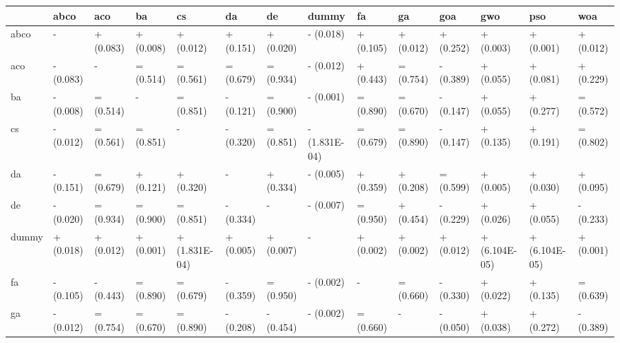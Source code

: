 \begin{table}
    \centering
    \begin{adjustbox}{width=\linewidth}
        \begin{tabular}{llllllllllllll}
            \toprule
            {}    & abco      & aco       & ba        & cs            & da        & de        & dummy         & fa        & ga        & goa       & gwo           & pso           & woa       \\
            \midrule
            abco  & -         & + (0.083) & + (0.008) & + (0.012)     & + (0.151) & + (0.020) & - (0.018)     & + (0.105) & + (0.012) & + (0.252) & + (0.003)     & + (0.001)     & + (0.012) \\
            aco   & - (0.083) & -         & = (0.514) & = (0.561)     & = (0.679) & = (0.934) & - (0.012)     & + (0.443) & = (0.754) & - (0.389) & + (0.055)     & + (0.081)     & + (0.229) \\
            ba    & - (0.008) & = (0.514) & -         & = (0.851)     & - (0.121) & = (0.900) & - (0.001)     & = (0.890) & = (0.670) & - (0.147) & + (0.055)     & + (0.277)     & = (0.572) \\
            cs    & - (0.012) & = (0.561) & = (0.851) & -             & - (0.320) & = (0.851) & - (1.831E-04) & = (0.679) & = (0.890) & - (0.147) & + (0.135)     & + (0.191)     & = (0.802) \\
            da    & - (0.151) & = (0.679) & + (0.121) & + (0.320)     & -         & + (0.334) & - (0.005)     & + (0.359) & + (0.208) & = (0.599) & + (0.005)     & + (0.030)     & + (0.095) \\
            de    & - (0.020) & = (0.934) & = (0.900) & = (0.851)     & - (0.334) & -         & - (0.007)     & = (0.950) & + (0.454) & - (0.229) & + (0.026)     & + (0.055)     & - (0.233) \\
            dummy & + (0.018) & + (0.012) & + (0.001) & + (1.831E-04) & + (0.005) & + (0.007) & -             & + (0.002) & + (0.002) & + (0.012) & + (6.104E-05) & + (6.104E-05) & + (0.001) \\
            fa    & - (0.105) & - (0.443) & = (0.890) & = (0.679)     & - (0.359) & = (0.950) & - (0.002)     & -         & = (0.660) & - (0.330) & + (0.022)     & + (0.135)     & = (0.639) \\
            ga    & - (0.012) & = (0.754) & = (0.670) & = (0.890)     & - (0.208) & - (0.454) & - (0.002)     & = (0.660) & -         & - (0.050) & + (0.038)     & + (0.272)     & - (0.389) \\

\end{tabular}
\end{adjustbox}
\end{table}
